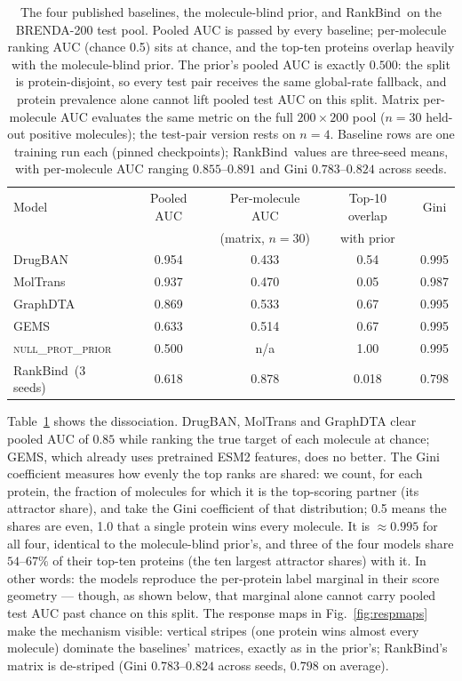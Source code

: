 \documentclass[11pt,a4paper]{article}
\newcommand{\method}{RankBind\xspace}
\newcommand{\nullprior}{\textsc{null\_prot\_prior}\xspace}
\begin{document}
\begin{table}[t]
\centering
\caption{The four published baselines, the molecule-blind prior, and
\method\ on the BRENDA-200 test pool. Pooled AUC is passed by every
baseline; per-molecule ranking AUC (chance 0.5) sits at chance, and
the top-ten proteins overlap heavily with the molecule-blind prior.
The prior's pooled AUC is exactly $0.500$: the split is
protein-disjoint, so every test pair receives the same global-rate
fallback, and protein prevalence alone cannot lift pooled test AUC on
this split.
Matrix per-molecule AUC evaluates the same metric on the full
$200\times200$ pool ($n=30$ held-out positive molecules); the test-pair
version rests on $n=4$. Baseline rows are one training run each (pinned
checkpoints); \method\ values are three-seed means, with per-molecule AUC
ranging $0.855$--$0.891$ and Gini $0.783$--$0.824$ across seeds.}
\label{tab:phase1}
\small
\setlength{\tabcolsep}{5pt}
\begin{tabular}{lcccc}
\toprule
Model & Pooled AUC & Per-molecule AUC & Top-10 overlap & Gini \\
      &            & (matrix, $n{=}30$) & with prior & \\
\midrule
DrugBAN     & 0.954 & 0.433 & 0.54 & 0.995 \\
MolTrans    & 0.937 & 0.470 & 0.05 & 0.987 \\
GraphDTA    & 0.869 & 0.533 & 0.67 & 0.995 \\
GEMS        & 0.633 & 0.514 & 0.67 & 0.995 \\
\midrule
\nullprior\ & 0.500  & n/a  & 1.00 & 0.995 \\
\midrule
\method\ (3 seeds) & 0.618 & 0.878 & 0.018 & 0.798 \\
\bottomrule
\end{tabular}
\end{table}

Table~\ref{tab:phase1} shows the dissociation. DrugBAN, MolTrans and
GraphDTA clear pooled AUC of $0.85$ while ranking the true target of each
molecule at chance; GEMS, which already uses pretrained ESM2
features, does no better. The Gini coefficient measures how evenly the top
ranks are shared: we count, for each protein, the fraction of molecules for
which it is the top-scoring partner (its attractor share), and take the Gini
coefficient of that distribution; 0.5 means the shares are even, 1.0 that a
single protein wins every molecule. It is $\approx 0.995$ for all four,
identical to the molecule-blind prior's, and three of the four models share
$54$--$67\%$ of their top-ten proteins (the ten largest attractor shares)
with it. In other words: the models reproduce the per-protein label
marginal in their score geometry --- though, as shown below, that marginal
alone cannot carry pooled test AUC past chance on this split. The response maps in
Fig.~\ref{fig:respmaps}
make the mechanism visible: vertical stripes (one protein wins almost every
molecule) dominate the baselines' matrices, exactly as in the prior's;
\method's matrix is de-striped (Gini $0.783$--$0.824$ across seeds,
$0.798$ on average).
\end{document}
